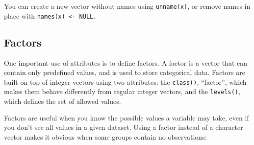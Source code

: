 You can create a new vector without names using \texttt{unname(x)}, or
remove names in place with \texttt{names(x) \textless{}- NULL}.

\subsection{Factors}

One important use of attributes is to define factors. A factor is a
vector that can contain only predefined values, and is used to store
categorical data. Factors are built on top of integer vectors using two
attributes: the \texttt{class()}, ``factor'', which makes them behave
differently from regular integer vectors, and the \texttt{levels()},
which defines the set of allowed values. 

\begin{Shaded}
\begin{Highlighting}[]
\StringTok{ }\NormalTok{(}\NormalTok{(}\NormalTok{, }\NormalTok{, }\NormalTok{, }\NormalTok{))}

\NormalTok{x[}\NormalTok{] <-}
\CommentTok{#> Warning in `[<-.factor`(`*tmp*`, 2, value = "c"): invalid}

\NormalTok{(}\NormalTok{(}\NormalTok{), }\NormalTok{(}\NormalTok{))}
\end{Highlighting}
\end{Shaded}

Factors are useful when you know the possible values a variable may
take, even if you don't see all values in a given dataset. Using a
factor instead of a character vector makes it obvious when some groups
contain no observations:

\begin{Shaded}
\begin{Highlighting}[]
\StringTok{ }\NormalTok{(}\NormalTok{, }\NormalTok{, }\NormalTok{)}
\StringTok{ } \NormalTok{(}\NormalTok{, }\NormalTok{))}

\end{Highlighting}
\end{Shaded}

